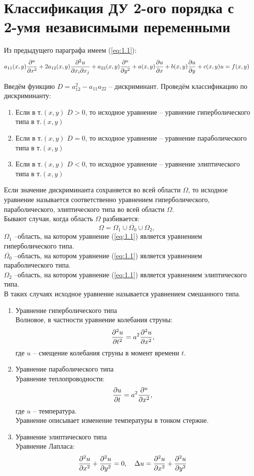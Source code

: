 \documentclass[../main.tex]{subfiles}
\begin{document}
\section{Классификация ДУ 2-ого порядка с 2-умя независимыми переменными}
Из предыдущего параграфа имеем (\ref{eq:1.1}):
\[
    a_{11}(x,y)\frac{\partial ^u}{\partial x^2} + 2a_{12}(x,y)\frac{\partial ^2u}{\partial x_i \partial{x_j}} +
    a_{22}(x,y)\frac{\partial ^u}{\partial y^2} + a(x,y)\frac{\partial u}{\partial x} + b(x,y)\frac{\partial u}{\partial y} + c(x,y)u = f(x,y)
\]

Введём функцию $D = a_{12}^2-a_{11}a_{22}$ -- дискриминант.
Проведём классификацию по дискриминанту:
\begin{enumerate}
    \item 
    Если в т.$(x,y)$ $D>0$, то исходное уравнение -- 
    уравнение гиперболического типа в т.$(x,y)$
    \item
    Если в т.$(x,y)$ $D=0$, то исходное уравнение -- 
    уравнение параболического типа в т.$(x,y)$
    \item
    Если в т.$(x,y)$ $D<0$, то исходное уравнение -- 
    уравнение элиптического типа в т.$(x,y)$
\end{enumerate}

Если значение дискриминанта сохраняется во всей области $\Omega$, 
то исходное уравнение называется соответственно уравнением гиперболического,
параболического, элиптического типа во всей области $\Omega$.\\

Бывают случаи, когда область $\Omega$ разбивается:
\[\Omega = \Omega_1 \cup \overline{\Omega_0} \cup \Omega_2, \]
$\Omega_1$ --область, на котором уравнение (\ref{eq:1.1}) является уравнением гиперболического типа.\\
$\overline{\Omega_0}$ --область, на котором уравнение (\ref{eq:1.1}) является уравнением параболического типа.\\
$\Omega_2$ --область, на котором уравнение (\ref{eq:1.1}) является уравнением элиптического типа.\\
В таких случаях исходное уравнение называется уравнением смешанного типа.

\begin{enumerate}
    \item Уравнение гиперболического типа\\
    Волновое, в частности уравнение колебания струны:
    \[\frac{\partial ^2u}{\partial t^2}=a^2\frac{\partial ^2u}{\partial x^2},\]
    где $u$ -- смещение колебания струны в момент времени $t$.
    \item Уравнение параболического типа\\
    Уравнение теплопроводности:
    \[\frac{\partial u}{\partial t}=a^2\frac{\partial ^u}{\partial x^2},\]
    где $u$ -- температура.\\
    Уравнение описывает изменение температуры в тонком стержне.
    \item Уравнение элиптического типа\\
    Уравнение Лапласа:
    \[
        \frac{\partial ^2u}{\partial x^2}+\frac{\partial ^2u}{\partial y^2} = 0,\quad
        \Delta u=\frac{\partial ^2u}{\partial x^2}+\frac{\partial ^2u}{\partial y^2}
    \]
\end{enumerate}
\end{document}
